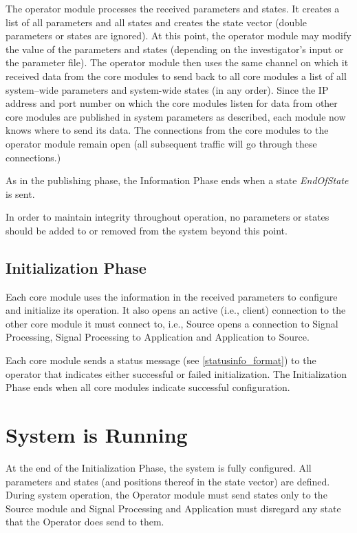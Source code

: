 \documentclass[letterpaper,oneside,12pt]{book}
\begin{document}
The operator module processes the received parameters and states. It creates a 
list of all parameters and all states and creates the state vector (double 
parameters or states are ignored). At this point, the operator module may modify 
the value of the parameters and states (depending on the investigator's input or 
the parameter file). The operator module then uses the same channel on which it 
received data from the core modules to send back to all core modules a list of 
all system--wide parameters and system-wide states (in any order). Since the IP 
address and port number on which the core modules listen for data from other 
core modules are published in system parameters as described, each module now 
knows where to send its data. The connections from the core modules to the 
operator module remain open (all subsequent traffic will go through these 
connections.)

As in the publishing phase, the Information Phase ends when a state 
\textit{EndOfState} is sent.

In order to maintain integrity throughout operation, no parameters or states 
should be added to or removed from the system beyond this point.


\subsection{Initialization Phase}

Each core module uses the information in the received parameters to configure and 
initialize its operation. It also opens an active (i.e., client) connection 
to the other core module it must connect to, i.e., Source opens a 
connection to Signal Processing, Signal Processing to Application and 
Application to Source.

Each core module sends a status message (see \ref{statusinfo_format}) to the 
operator that indicates either successful or failed initialization. The 
Initialization Phase ends when all core modules indicate successful 
configuration.


\section{System is Running}
\label{system_performance}

At the end of the Initialization Phase, the system is fully configured. All 
parameters and states (and positions thereof in the state vector) are defined. 
During system operation, the Operator module must send states only to the Source 
module and Signal Processing and Application must disregard any state that the 
Operator does send to them. 
\end{document}
